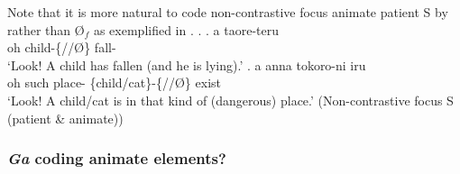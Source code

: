 Note that
it is more natural to code non-contrastive focus animate patient S by  rather than {\O$_{f}$} as exemplified in \Next.
%
\ex. \label{ExAnimateS}
	\ag. a  taore-teru \\
		oh child-\{//{\O}\} fall- \\
		`Look! A child has fallen (and he is lying).'
	\bg. a anna tokoro-ni  iru \\
		oh such place- \{child/cat\}-\{//{\O}\} exist \\
		`Look! A child/cat is in that kind of (dangerous) place.' \hfill{(Non-contrastive focus S (patient \& animate))}


\subsubsection{\textit{Ga} coding animate elements?}\label{Par:CasePar:Ga:GaAnim}

